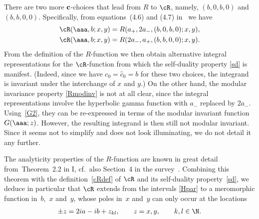 \documentclass[pdftex]{sigma}
\numberwithin{equation}{section}
\begin{document}
There are two more ${\bf c}$-choices that lead from $R$ to $\cR$, namely, $(b,0,b,0)$ and $(b,b,0,0)$. Specif\/ically, from equations~(4.6) and (4.7) in~\cite{quad} we have
\begin{gather}\label{cR3}
\cR(\aaa,b;x,y)=R(a_{+},2a_{-},(b,0,b,0);x,y),
\\
\label{cR4}
\cR(\aaa,b;x,y)=R(2a_{-},a_{+},(b,b,0,0);x,y).
\end{gather}
From the def\/inition of the $R$-function we then obtain alternative integral representations for the $\cR$-function from which the self-duality property \eqref{sd} is manifest. (Indeed, since we have $c_0=\hat{c}_0=b$ for these two choices, the integrand is invariant under the interchange of $x$ and $y$.) On the other hand, the modular invariance property \eqref{Rmodinv} is not at all clear, since the integral representations involve the hyperbolic gamma function
 with $a_{-}$ replaced by $2a_{-}$. Using~\eqref{G2},
 they can be re-expressed in terms of the modular invariant function $G(\aaa;z)$. However, the resulting integrand is then still not modular invariant. Since it seems not to simplify and does not look
illuminating, we do not detail it any further.

The analyticity properties of the $R$-function are known in great detail from~Theorem~2.2 in I, cf.~also Section~4 in the survey~\cite{Rsurv}. Combining this theorem with the def\/inition~\eqref{cRdef} of $\cR$ and its self-duality property~\eqref{sd}, we deduce in particular that $\cR$ extends from the intervals \eqref{Hpar} to a meromorphic function in~$b$,~$x$ and~$y$, whose poles in~$x$ and~$y$ can only occur at the locations
\begin{gather}\label{cRpoles}
\pm z=2ia-ib+z_{kl},\qquad  z=x,y,\qquad k,l\in \N.
\end{gather}
\end{document}
